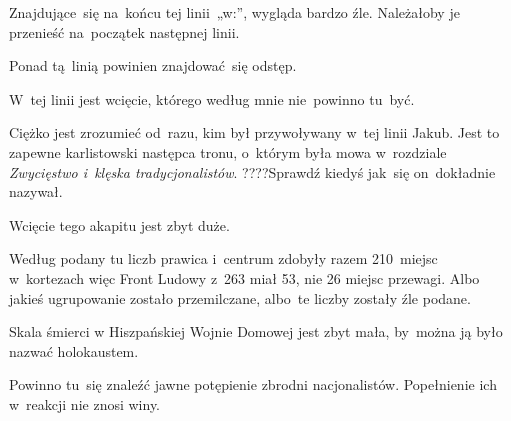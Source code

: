 \documentclass[a4paper,11pt]{article}
\begin{document}
\VerSpaceFour





\noindent
{} Znajdujące~się na~końcu tej linii~„w:”, wygląda bardzo
źle. Należałoby je przenieść na~początek następnej linii.

\VerSpaceFour





\noindent
{} Ponad tą~linią powinien znajdować~się odstęp.

\VerSpaceFour





\noindent
{} W~tej linii jest wcięcie, którego według mnie
nie~powinno tu~być.

\VerSpaceFour





\noindent
{} Ciężko jest zrozumieć od~razu, kim był przywoływany
w~tej linii Jakub. Jest to zapewne karlistowski następca tronu, o~którym
była mowa w~rozdziale \textit{Zwycięstwo i~klęska tradycjonalistów}.
????Sprawdź kiedyś jak~się on~dokładnie nazywał.

\VerSpaceFour





\noindent
{} Wcięcie tego akapitu jest zbyt duże.

\VerSpaceFour





\noindent
{} Według podany tu liczb prawica i~centrum zdobyły razem 210~miejsc
w~kortezach więc Front Ludowy z~263 miał 53, nie 26 miejsc przewagi. Albo
jakieś ugrupowanie zostało przemilczane, albo~te liczby zostały źle podane.

\VerSpaceFour





\noindent
{} Skala śmierci w Hiszpańskiej Wojnie Domowej jest zbyt
mała, by~można ją było nazwać holokaustem.

\VerSpaceFour





\noindent
{} Powinno tu~się znaleźć jawne potępienie zbrodni
nacjonalistów. Popełnienie ich w~reakcji nie znosi winy.

\VerSpaceFour
\end{document}
